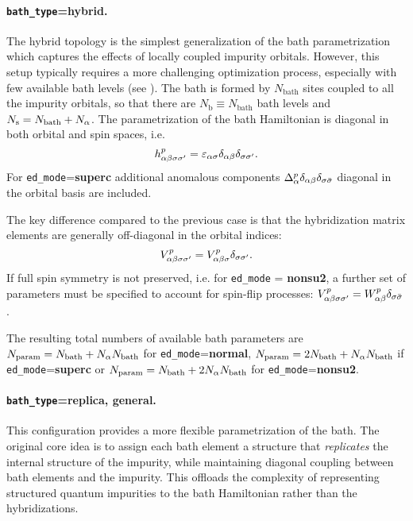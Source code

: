 \documentclass[edipack_sp.tex]{subfiles}
\begin{document}
\paragraph{{\tt bath\_type}={\bf hybrid}.}
The hybrid topology is the simplest generalization of the bath pa\-ra\-me\-tri\-za\-tion which captures the effects of locally
coupled impurity orbitals. However, this setup typically requires a more challenging optimization process, especially
with few available bath levels (see ). 
The bath is formed by $N_\mathrm{bath}$ sites coupled to all the
impurity orbitals, so that there are $N_\mathrm{b}\equiv  N_\mathrm{bath}$ bath levels and   $N_\mathrm{s}=N_\mathrm{bath}+N_\alpha$. 
The parametrization of the bath Hamiltonian is 
diagonal in both orbital and spin spaces, i.e.
$$
h^p_{\alpha\beta\sigma\sigma'}=\varepsilon_{\alpha\sigma}\delta_{\alpha\beta}\delta_{\sigma\sigma'}.
$$
For {\tt ed\_mode}={\bf superc} additional anomalous components 
$\Delta_\alpha^p\delta_{\alpha\beta}\delta_{\sigma\bar{\sigma}}$ diagonal in the orbital basis are included.
%

The key difference compared to the previous case is that the hybridization matrix elements are generally off-diagonal in the orbital indices:
$$
V^p_{\alpha\beta\sigma\sigma'}=V^p_{\alpha\beta\sigma}\delta_{\sigma\sigma'}.
$$
%
If full spin symmetry is not preserved, i.e. for {\tt ed\_mode} = {\bf nonsu2}, a further 
set of parameters must be specified to account for spin-flip processes:
$V^p_{\alpha\beta\sigma\sigma'} = W^p_{\alpha\beta}\delta_{\sigma \bar{\sigma}}$. 
%

The resulting total numbers of available bath parameters are 
 $N_\mathrm{param}=N_\mathrm{bath}+ N_\alpha N_\mathrm{bath}$ for {\tt ed\_mode}={\bf normal},  
 $N_\mathrm{param}=2N_\mathrm{bath}+ N_\alpha N_\mathrm{bath}$ if  {\tt ed\_mode}={\bf superc} or 
$N_\mathrm{param}=N_\mathrm{bath}+ 2N_\alpha N_\mathrm{bath}$ for  {\tt ed\_mode}={\bf nonsu2}.



\paragraph{{\tt bath\_type}={\bf replica}, {\bf general}.}
This configuration provides a more flexible parametrization of the 
bath. The original core idea \cite{Capone2004PRB,Civelli2006,Koch2008PRB}
is to assign each bath element a structure 
that {\it replicates} the internal structure of the impurity, while 
maintaining diagonal coupling between bath elements and the impurity. 
This offloads the complexity of representing structured quantum 
impurities to the bath Hamiltonian rather than the hybridizations.
\end{document}
